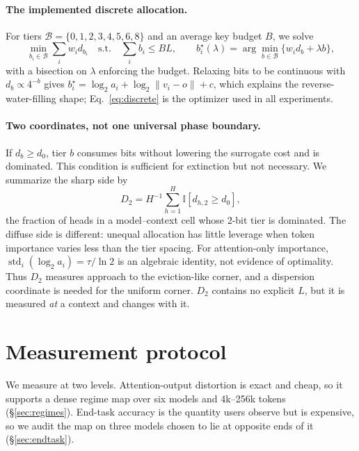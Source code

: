 \documentclass{article}
\theoremstyle{definition}
\begin{document}
\paragraph{The implemented discrete allocation.}
For tiers $\mathcal B=\{0,1,2,3,4,5,6,8\}$ and an average key budget $B$, we solve
\begin{equation}
 \min_{b_i\in\mathcal B}\sum_i w_i d_{b_i}
 \quad\text{s.t.}\quad \sum_i b_i\le BL,
 \qquad
 b_i^\star(\lambda)=\arg\min_{b\in\mathcal B}\{w_i d_b+\lambda b\},
 \label{eq:discrete}
\end{equation}
with a bisection on $\lambda$ enforcing the budget.  Relaxing bits to be continuous with $d_b\propto4^{-b}$ gives $b_i^\star=\log_2a_i+\log_2\|v_i-o\|+c$, which explains the reverse-water-filling shape; Eq.~\ref{eq:discrete} is the optimizer used in all experiments.

\paragraph{Two coordinates, not one universal phase boundary.}
If $d_b\ge d_0$, tier $b$ consumes bits without lowering the surrogate cost and is dominated.  This condition is sufficient for extinction but not necessary.  We summarize the sharp side by
\begin{equation}
 D_2=H^{-1}\textstyle\sum_{h=1}^{H}\mathbb I[d_{h,2}\ge d_0],
 \label{eq:d2}
\end{equation}
the fraction of heads in a model--context cell whose 2-bit tier is dominated.  The diffuse side is different: unequal allocation has little leverage when token importance varies less than the tier spacing.  For attention-only importance, $\operatorname{std}_i(\log_2a_i)=\tau/\ln2$ is an algebraic identity, not evidence of optimality.  Thus $D_2$ measures approach to the eviction-like corner, and a dispersion coordinate is needed for the uniform corner.  $D_2$ contains no explicit $L$, but it is measured \emph{at} a context and changes with it.

\section{Measurement protocol}
\label{sec:protocol}

We measure at two levels.  Attention-output distortion is exact and cheap, so it supports a dense regime map over six models and 4k--256k tokens (\S\ref{sec:regimes}).  End-task accuracy is the quantity users observe but is expensive, so we audit the map on three models chosen to lie at opposite ends of it (\S\ref{sec:endtask}).
\end{document}
